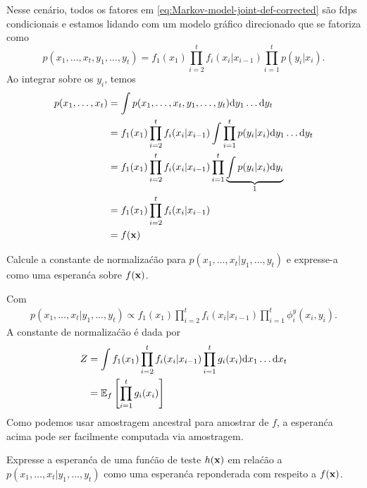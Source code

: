 \begin{exenumerate}
    \begin{solution}
        Nesse cenário, todos os fatores em \eqref{eq:Markov-model-joint-def-corrected}
        s\~ao fdps condicionais e estamos lidando com um modelo gr\'afico
        direcionado que se fatoriza como
        \begin{equation}
            p(x_1, \ldots, x_t, y_1, \ldots, y_t) = f_1(x_1) \prod_{i=2}^t f_i(x_i|x_{i-1}) \prod_{i=1}^t p(y_i|x_i).
        \end{equation}
        Ao integrar sobre os $y_i$, temos
        \begin{align}
            p(x_1, \ldots, x_t) &= \int p(x_1, \ldots, x_t, y_1, \ldots, y_t) \mathrm{d} y_1 \ldots \mathrm{d} y_t\\
            & = f_1(x_1) \prod_{i=2}^t f_i(x_i|x_{i-1}) \int \prod_{i=1}^t p(y_i|x_i) \mathrm{d} y_1 \ldots \mathrm{d} y_t\\
            & = f_1(x_1) \prod_{i=2}^t f_i(x_i|x_{i-1}) \prod_{i=1}^t \underbrace{\int  p(y_i|x_i) \mathrm{d} y_i}_{1}\\
            & = f_1(x_1) \prod_{i=2}^t f_i(x_i|x_{i-1})\\
            & = f(\mathbf{x})
        \end{align}
        
    \end{solution}
    
    
    \item Calcule a constante de normaliza\'c\~ao para $p(x_1, \ldots, x_t | y_1, \ldots, y_t)$ e expresse-a como uma esperan\'ca sobre $f(\mathbf{x})$.
    \begin{solution}
        Com
        \begin{align}
            p(x_1, \ldots, x_t | y_1, \ldots, y_t) \propto f_1(x_1) \prod_{i=2}^t f_i(x_i|x_{i-1}) \prod_{i=1}^t \phi_i^y(x_i, y_i).
        \end{align}
        A constante de normaliza\'c\~ao \'e dada por
        \begin{align}
            Z & = \int f_1(x_1) \prod_{i=2}^t f_i(x_i|x_{i-1})\prod_{i=1}^t g_i(x_i) \mathrm{d} x_1 \ldots \mathrm{d} x_t\\
            & = \mathbb{E}_f\left [\prod_{i=1}^t g_i(x_i) \right]
        \end{align}
        Como podemos usar amostragem ancestral para amostrar de $f$, a
        esperan\'ca acima pode ser facilmente computada via amostragem.
        
    \end{solution}
    
    \item Expresse a esperan\'ca de uma fun\'c\~ao de teste $h(\mathbf{x})$ em rela\'c\~ao
    a $p(x_1, \ldots, x_t | y_1, \ldots, y_t)$ como uma esperan\'ca reponderada
    com respeito a $f(\mathbf{x})$.
    

\end{exenumerate}
